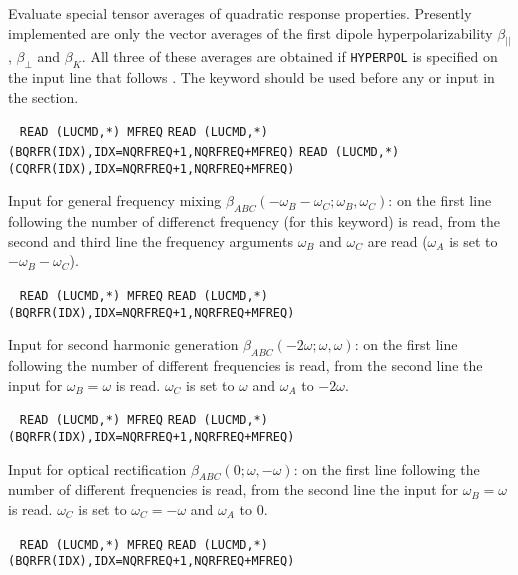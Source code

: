 \begin{description}
   Evaluate special tensor averages of quadratic response properties.
   Presently implemented are only the vector averages of the first
   dipole hyperpolarizability $\beta_{||}$, $\beta_{\bot}$ and 
   $\beta_K$. All three of these averages are obtained if 
   \verb+HYPERPOL+ is specified on the input line that follows
   .
   The  keyword should be used before any  
   or  input in the  section.
 
\item[\Key{MIXFRE}]  \verb| |\newline
   \verb|READ (LUCMD,*) MFREQ|\newline
   \verb|READ (LUCMD,*) (BQRFR(IDX),IDX=NQRFREQ+1,NQRFREQ+MFREQ)|\newline
   \verb|READ (LUCMD,*) (CQRFR(IDX),IDX=NQRFREQ+1,NQRFREQ+MFREQ)|

   Input for general frequency mixing 
   $\beta_{ABC}(-\omega_B-\omega_C;\omega_B,\omega_C)$: on the first line 
   following  the number of differenct frequency
   (for this keyword) is read, from the second and third line
   the frequency arguments $\omega_B$ and $\omega_C$ are read
   ($\omega_A$ is set to $-\omega_B-\omega_C$).

\item[\Key{SHGFRE}]  \verb| |\newline
   \verb|READ (LUCMD,*) MFREQ|\newline
   \verb|READ (LUCMD,*) (BQRFR(IDX),IDX=NQRFREQ+1,NQRFREQ+MFREQ)|

   Input for second harmonic generation $\beta_{ABC}(-2\omega;\omega,\omega)$:
   on the first line following  the number of different
   frequencies is read, from the second line the input for 
   $\omega_B = \omega$ is read. $\omega_C$ is set to $\omega$ 
   and $\omega_A$ to $-2\omega$.

\item[\Key{ORFREQ}]  \verb| |\newline
   \verb|READ (LUCMD,*) MFREQ|\newline
   \verb|READ (LUCMD,*) (BQRFR(IDX),IDX=NQRFREQ+1,NQRFREQ+MFREQ)|

   Input for optical rectification $\beta_{ABC}(0;\omega,-\omega)$:
   on the first line following  the number of different
   frequencies is read, from the second line the input for 
   $\omega_B = \omega$ is read. $\omega_C$ is set to $\omega_C = -\omega$ and
   $\omega_A$ to $0$.

\item[\Key{EOPEFR}]  \verb| |\newline
   \verb|READ (LUCMD,*) MFREQ|\newline
   \verb|READ (LUCMD,*) (BQRFR(IDX),IDX=NQRFREQ+1,NQRFREQ+MFREQ)|


\end{description}
